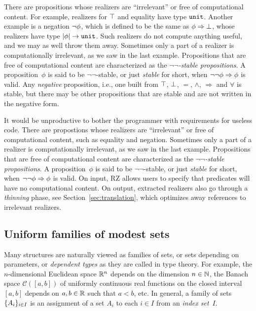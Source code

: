 \iflong
There are propositions whose realizers are ``irrelevant'' or free of
computational content. For example, realizers for $\top$ and
equality have type $\mathtt{unit}$. Another example is a negation
$\lnot \phi$, which is defined to be the same as
$\phi\Rightarrow \bot$, whose realizers have type
$|\phi| \to \mathtt{unit}$. Such realizers do not compute
anything useful, and we may as well throw them away. Sometimes only a
part of a realizer is computationally irrelevant, as we saw in the
last example. Propositions that are free of computational content
are characterized as the \emph{$\lnot\lnot$-stable propositions}. A
proposition~$\phi$ is said to be $\lnot\lnot$-stable, or just
\emph{stable} for short, when $\lnot \lnot \phi\Rightarrow \phi$ is
valid. Any \emph{negative} proposition, i.e., one built from $\top$,
$\bot$, $=$, $\land$, $\Rightarrow$ and $\forall$ is stable, but
there may be other propositions that are stable and are not written
in the negative form.

It would be unproductive to bother the programmer with requirements
for useless code.
%
\else
%
There are propostions whose realizers are ``irrelevant'' or free of
computational content, such as equality and negation. Sometimes only a
part of a realizer is computationally irrelevant, as we saw in the
last example. Propositions that are free of computational content are
characterized as the \emph{$\lnot\lnot$-stable propositions}. A
proposition~$\phi$ is said to be $\lnot\lnot$-stable, or just
\emph{stable} for short, when $\lnot \lnot \phi\Rightarrow \phi$ is
valid.
%
\fi
%
On input, RZ allows users to specify that predicates
will have no computational content. On output, extracted realizers
also go through a \emph{thinning} phase, see
Section~\ref{sec:translation}, which optimizes away references to
irrelevant realizers.


\iflong
\subsection{Uniform families of modest sets}
\fi %
\label{sec:uniform-families}

Many structures are naturally viewed as families of sets, or sets
depending on parameters, or \emph{dependent types} as they are called
in type theory. For example, the $n$-dimensional Euclidean space
$\mathbb{R}^n$ depends on the dimension $n \in \mathbb{N}$, the Banach space
$\mathcal{C}([a,b])$ of uniformly continuous real functions on the
closed interval $[a,b]$ depends on $a, b \in \mathbb{R}$ such that $a < b$,
etc. In general, a family of sets $\{A_i\}_{i \in I}$ is an
assignment of a set $A_i$ to each $i \in I$ from an \emph{index
  set}~$I$.

